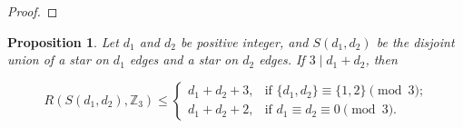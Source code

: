 \documentclass[11pt]{article}
\newtheorem{proposition}[theorem]{Proposition}
\begin{document}
\begin{proof}
    



\end{proof}

\begin{proposition}\label{prop:doublestars}
    Let $d_1$ and $d_2$ be positive integer, and $S(d_1,d_2)$ be the disjoint union of a star on $d_1$ edges and a star on $d_2$ edges. If $3\mid d_1+d_2$, then

    \[
R(S(d_1,d_2),\mathbb{Z}_3) \leq
\begin{cases}            d_1+d_2+3, & \text{if $\{d_1,d_2\} \equiv \{1,2\} \pmod 3$;}\\
             d_1+d_2+2, & \text{if $d_1 \equiv d_2 \equiv 0 \pmod 3$.} 
		 \end{cases}
\]
\end{proposition}
\end{document}

